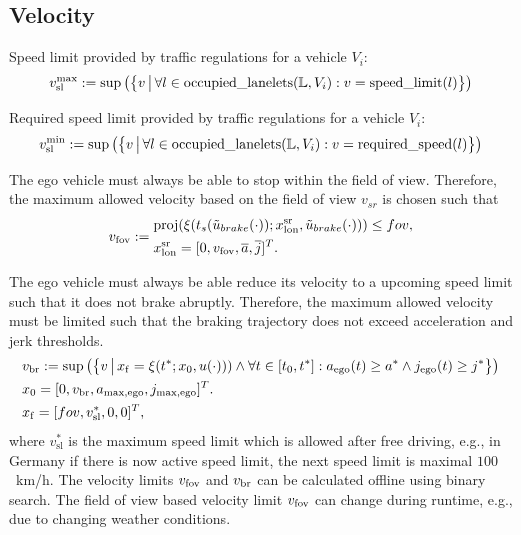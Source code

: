 \subsection{Velocity}
\label{sec:speed_limit}


Speed limit provided by traffic regulations for a vehicle $V_i$:
\begin{align}
v_\text{sl}^\text{max} := \sup \big( \big\{v   \, \big| \, \forall l \in \mathtt{\operatorname*{occupied\_lanelets}}(\mathbb{L}, V_i): v = \operatorname*{speed\_limit}(l) \big\} \big)
\end{align}

Required speed limit provided by traffic regulations for a vehicle $V_i$:
\begin{align}
v_\text{sl}^\text{min} := \sup \big( \big\{v   \, \big| \, \forall l \in \mathtt{\operatorname*{occupied\_lanelets}}(\mathbb{L}, V_i): v = \operatorname*{required\_speed}(l) \big\} \big)
\end{align}

The ego vehicle must always be able to stop within the field of view. Therefore, the maximum allowed velocity based on the field of view $v_{sr}$ is chosen such that
\begin{align}
v_\text{fov} := 
\begin{split}
& \mathrm{proj}(\xi(t_{s}(\tilde{u}_{brake}(\cdot));x_\mathrm{lon}^\mathrm{sr},\tilde{u}_{brake}(\cdot))) \leq fov, \\
& x_\mathrm{lon}^\mathrm{sr} = [0, v_\text{fov}, \overline{a}, \overline{j}]^T.
\end{split}
\end{align}

The ego vehicle must always be able reduce its velocity to a upcoming speed limit such that it does not brake abruptly. 
Therefore, the maximum allowed velocity must be limited such that the braking trajectory does not exceed acceleration and jerk thresholds.
\begin{align}
\begin{split}
& v_\text{br} :=  \sup \big( \big\{v   \, \big| \, x_\mathrm{f} = \xi(t^*;x_\mathrm{0}, u(\cdot))) \land \forall t \in [t_0, t^*]:a_\text{ego}(t) \geq a^* \land j_\text{ego}(t) \geq j^* \big\} \big) \\
& x_\mathrm{0} = [0,v_\text{br}, a_\text{max,ego}, j_\text{max,ego}]^T. \\
& x_\mathrm{f} = [fov, v_\mathrm{sl}^*, 0 , 0]^T,
\end{split}
\end{align}
where $v_\mathrm{sl}^*$ is the maximum speed limit which is allowed after free driving, e.g., in Germany if there is now active speed limit, the next speed limit is maximal $100$~km/h.
The velocity limits $v_\text{fov}$ and $v_\text{br}$ can be calculated offline using binary search. The field of view based velocity limit $v_\text{fov}$ can change during runtime, e.g., due to changing weather conditions.

